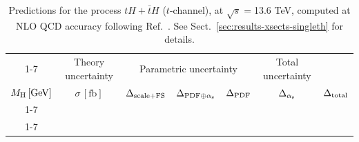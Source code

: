 \begin{table}[ht!]
\caption{\label{tab:th-t-tot136} Predictions for the process $tH + \bar t H$ ($t$-channel), at $\sqrt{s}=$13.6 TeV, computed at NLO QCD accuracy following Ref.~\cite{Demartin:2015uha}. See Sect.~\ref{sec:results-xsects-singleth} for details.}
\centering
\scriptsize
{\renewcommand{\arraystretch}{1.4}
\begin{tabular}{| cc | c | ccc | c |}
\cline{1-7}
\multicolumn{2}{|c|}{\(\sqrt{s} = 13.6\,\mathrm{TeV}\)} &
\multicolumn{1}{|c|}{Theory uncertainty} &
\multicolumn{3}{|c|}{Parametric uncertainty} &
\multicolumn{1}{c|}{Total uncertainty} \\
\(M_\mathrm{H}\,[\mathrm{GeV}]\) & \(\sigma\,[\mathrm{fb}]\) &
\(\Delta_{\rm scale+\textrm{FS}}\) &
\(\Delta_{{\rm PDF}\oplus\alpha_{\mathrm{s}}}\) &
{\color{black!55}\(\Delta_{\rm PDF}\)} & {\color{black!55}\(\Delta_{\alpha_{\mathrm{s}}}\)} &
\(\Delta_{\rm total}\)
\\
\cline{1-7}
 \\
\cline{1-7}
\end{tabular}
}
\end{table}

